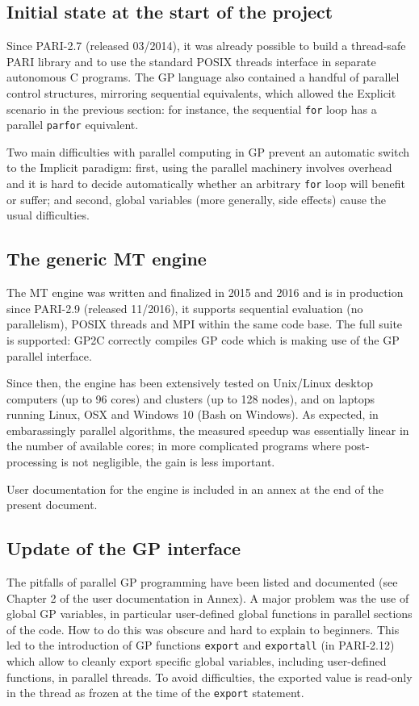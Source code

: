 \documentclass{deliverablereport}
\begin{document}
\subsection{Initial state at the start of the project}
Since PARI-2.7 (released 03/2014), it was already possible to build a
thread-safe PARI library and to use the standard POSIX threads interface in
separate autonomous C programs. The GP language also contained a handful of
parallel control structures, mirroring sequential equivalents, which
allowed the Explicit scenario in the previous section: for instance, the
sequential \texttt{for} loop has a parallel \texttt{parfor} equivalent.

Two main difficulties with parallel computing in GP prevent an automatic
switch to the Implicit paradigm: first, using the parallel machinery 
involves overhead and it is hard to decide automatically whether
an arbitrary \texttt{for} loop will benefit or suffer; and second, 
global variables (more generally, side effects) cause the usual difficulties.

\subsection{The generic MT engine}
The MT engine was written and finalized in 2015 and 2016 and is in
production since PARI-2.9 (released 11/2016), it supports sequential
evaluation (no parallelism), POSIX threads and MPI within the same code
base. The full suite is supported: GP2C correctly compiles GP code which is
making use of the GP parallel interface.

Since then, the engine has been extensively tested on Unix/Linux
desktop computers (up to 96 cores) and clusters (up to 128 nodes), and on
laptops running Linux, OSX and Windows 10 (Bash on Windows). As expected, in
embarassingly parallel algorithms, the measured speedup was essentially
linear in the number of available cores; in more complicated programs where
post-processing is not negligible, the gain is less important.

User documentation for the engine is included in an annex at the end of the
present document.

\subsection{Update of the GP interface}

The pitfalls of parallel GP programming have been listed and documented
(see Chapter 2 of the user documentation in Annex). A major problem was the
use of global GP variables, in particular user-defined global functions
in parallel sections of the code. How to do this was obscure and hard to
explain to beginners. This led to the introduction of GP functions
\texttt{export} and \texttt{exportall} (in PARI-2.12) which allow to cleanly 
export specific global variables, including user-defined functions, in
parallel threads. To avoid difficulties, the exported value is read-only in
the thread as frozen at the time of the \texttt{export} statement.
\end{document}
